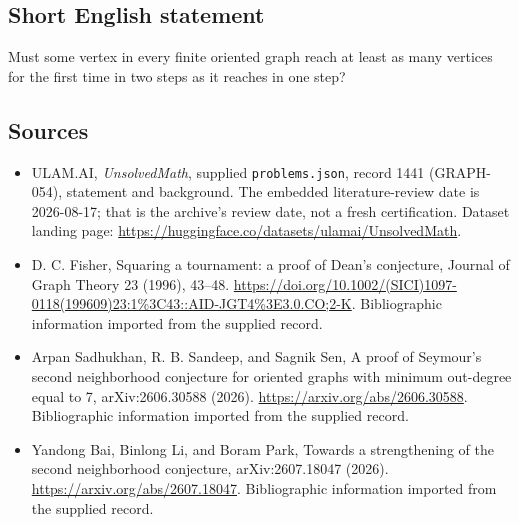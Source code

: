 \documentclass[11pt,a4paper]{article}
\begin{document}
\subsection{Short English statement}

Must some vertex in every finite oriented graph reach at least as many vertices for the first time in two steps as it reaches in one step?

\subsection{Sources}

{\small

\begin{itemize}

\item[\hypertarget{source:1441:1}{S1}] ULAM.AI, \emph{UnsolvedMath}, supplied \texttt{problems.json}, record 1441 (GRAPH-054), statement and background. The embedded literature-review date is 2026-08-17; that is the archive’s review date, not a fresh certification. Dataset landing page: \url{https://huggingface.co/datasets/ulamai/UnsolvedMath}.

\item[\hypertarget{source:1441:2}{S2}] D. C. Fisher, Squaring a tournament: a proof of Dean's conjecture, Journal of Graph Theory 23 (1996), 43–48. \url{https://doi.org/10.1002/(SICI)1097-0118(199609)23:1%3C43::AID-JGT4%3E3.0.CO;2-K}. Bibliographic information imported from the supplied record.

\item[\hypertarget{source:1441:3}{S3}] Arpan Sadhukhan, R. B. Sandeep, and Sagnik Sen, A proof of Seymour's second neighborhood conjecture for oriented graphs with minimum out-degree equal to 7, arXiv:2606.30588 (2026). \url{https://arxiv.org/abs/2606.30588}. Bibliographic information imported from the supplied record.

\item[\hypertarget{source:1441:4}{S4}] Yandong Bai, Binlong Li, and Boram Park, Towards a strengthening of the second neighborhood conjecture, arXiv:2607.18047 (2026). \url{https://arxiv.org/abs/2607.18047}. Bibliographic information imported from the supplied record.

\end{itemize}

}

\label{end:1441}
\end{document}
